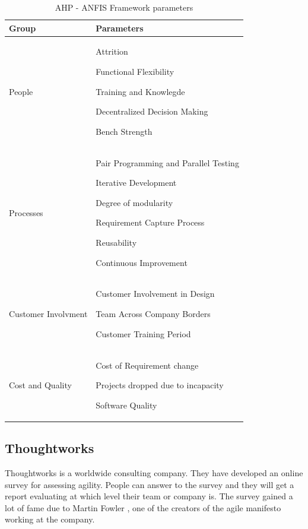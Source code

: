 \begin{table} [H]
\begin{tabular}{| p{3cm} | p{12cm}|}
    \hline
     \textbf{Group} & \textbf{Parameters} \\ \hline
     People  &  \begin{inparaenum} [a\upshape)] \item Attrition \item Functional Flexibility \item Training and Knowlegde \item Decentralized Decision Making \item Bench Strength \end{inparaenum} \\ \hline
     Processes  & \begin{inparaenum} [a\upshape)] \item Pair Programming and Parallel Testing \item Iterative Development \item Degree of modularity \item Requirement Capture Process \item Reusability \item Continuous Improvement
     \end{inparaenum} \\ \hline
    Customer Involvment & \begin{inparaenum} [a\upshape)] \item Customer Involvement in Design \item Team Across Company Borders \item Customer Training Period \end{inparaenum} \\ \hline
     Cost and Quality  & \begin{inparaenum} [a\upshape)] \item Cost of Requirement change \item Projects dropped due to incapacity \item Software Quality \end{inparaenum} \\ \hline
  \end{tabular}
\caption{AHP - ANFIS Framework parameters}
\label{anfis_framework}
\end{table}

\subsection{Thoughtworks} %
Thoughtworks \cite{thoughtworks} is a worldwide consulting company. They have developed an online survey for assessing agility. People can answer to the survey and they will get a report evaluating at which level their team or company is. The survey gained a lot of fame due to Martin Fowler \cite{martin_fowler}, one of the creators of the agile manifesto working at the company.


